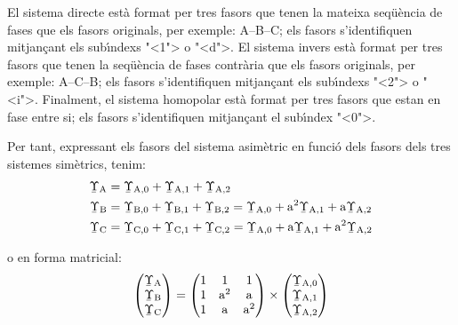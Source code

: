 \begin{center}
    
    \label{pic:Comp_sim}
\end{center}

 
 El sistema directe est\`{a} format per tres
fasors que tenen la mateixa seq\"{u}\`{e}ncia de fases que els fasors
originals, per exemple: A--B--C; els fasors
s'identifiquen mitjan\c{c}ant els sub\'{\i}ndexs {"<}1{">} o {"<}d{">}. El sistema
invers est\`{a} format per tres fasors que tenen la seq\"{u}\`{e}ncia de fases contr\`{a}ria
 que els fasors originals, per exemple: A--C--B; els fasors s'identifiquen mitjan\c{c}ant els
sub\'{\i}ndexs {"<}2{">} o {"<}i{">}. Finalment, el sistema homopolar est\`{a}
format per tres fasors que estan en fase entre si; els fasors
s'identifiquen mitjan\c{c}ant el sub\'{\i}ndex {"<}0{">}.

Per tant, expressant els fasors del sistema asim\`{e}tric en funci\'{o}
dels fasors dels tres sistemes sim\`{e}trics, tenim:
\begin{subequations}
\begin{align}
   \cmplx{\Upsilon}\ped{A} &= \cmplx{\Upsilon}\ped{A,0}  +
   \cmplx{\Upsilon}\ped{A,1} + \cmplx{\Upsilon}\ped{A,2} \label{eq:c_sim_a}\\
   \cmplx{\Upsilon}\ped{B} &= \cmplx{\Upsilon}\ped{B,0} + \cmplx{\Upsilon}\ped{B,1} +
   \cmplx{\Upsilon}\ped{B,2}  =  \cmplx{\Upsilon}\ped{A,0} + \au^2
   \cmplx{\Upsilon}\ped{A,1} + \au \cmplx{\Upsilon}\ped{A,2} \label{eq:c_sim_b}\\
   \cmplx{\Upsilon}\ped{C} &= \cmplx{\Upsilon}\ped{C,0} + \cmplx{\Upsilon}\ped{C,1} +
   \cmplx{\Upsilon}\ped{C,2}  = \cmplx{\Upsilon}\ped{A,0} + \au
   \cmplx{\Upsilon}\ped{A,1} + \au^2 \cmplx{\Upsilon}\ped{A,2} \label{eq:c_sim_c}
\end{align}
\end{subequations}

o en forma matricial:
\begin{equation}
   \begin{pmatrix}
     \cmplx{\Upsilon}\ped{A} \\
     \cmplx{\Upsilon}\ped{B} \\
     \cmplx{\Upsilon}\ped{C}
   \end{pmatrix} =
   \begin{pmatrix}
     1 & 1 & 1 \\
     1 & \au^2 & \au\\
     1 & \au & \au^2
   \end{pmatrix} \times
   \begin{pmatrix}
     \cmplx{\Upsilon}\ped{A,0} \\
     \cmplx{\Upsilon}\ped{A,1} \\
     \cmplx{\Upsilon}\ped{A,2}
   \end{pmatrix}
\end{equation}

